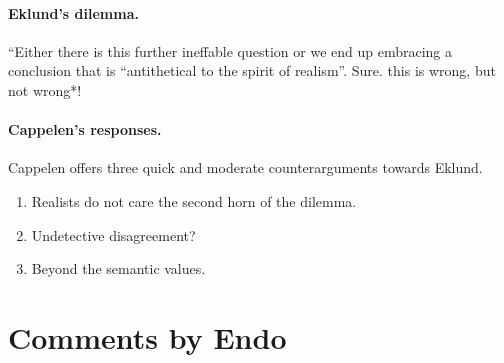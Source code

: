 \documentclass[
10pt, %
a4paper, %
twocolumn, %
landscape %
]{article}
\begin{document}
\paragraph{Eklund's dilemma.}
``Either there is this further ineffable question or we end up embracing a conclusion that is ``antithetical to the spirit of realism''. Sure. this is wrong, but not wrong*!

\paragraph{Cappelen's responses.}
Cappelen offers three quick and moderate counterarguments towards Eklund.

\begin{enumerate}
  \item Realists do not care the second horn of the dilemma.
  \item Undetective disagreement?
  \item Beyond the semantic values. 
\end{enumerate}

\section*{Comments by Endo}



\end{document}
